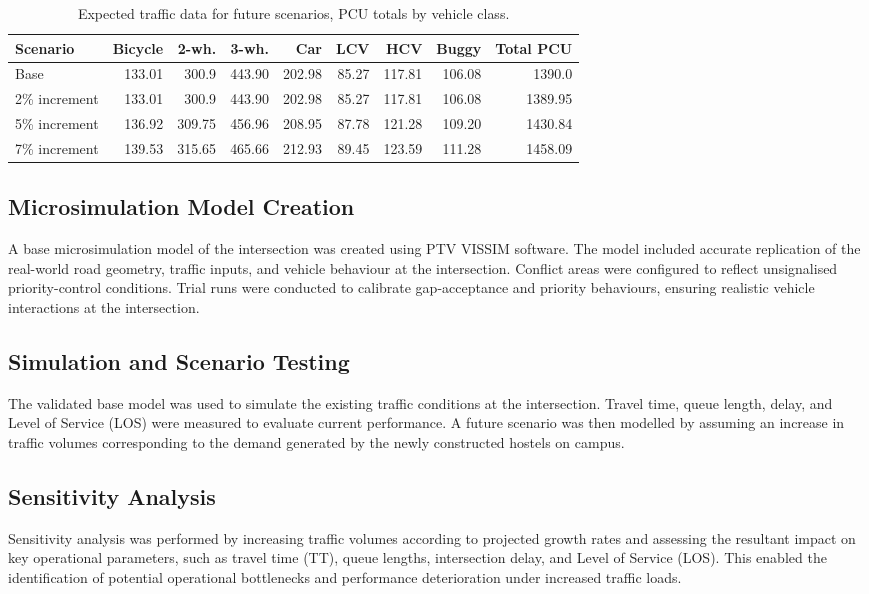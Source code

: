\documentclass[11pt]{article}
\begin{document}
\begin{table}[H]
  \centering
  \small
  \caption{Expected traffic data for future scenarios, PCU totals by vehicle class.}
  \begin{tabular}{@{}lrrrrrrrr@{}}
    \toprule
    \textbf{Scenario} & \textbf{Bicycle} & \textbf{2-wh.} & \textbf{3-wh.} & \textbf{Car} & \textbf{LCV} & \textbf{HCV} & \textbf{Buggy} & \textbf{Total PCU} \\
    \midrule
    Base            & 133.01 & 300.9  & 443.90 & 202.98 & 85.27 & 117.81 & 106.08 & 1390.0 \\
    2\% increment   & 133.01 & 300.9  & 443.90 & 202.98 & 85.27 & 117.81 & 106.08 & 1389.95 \\
    5\% increment   & 136.92 & 309.75 & 456.96 & 208.95 & 87.78 & 121.28 & 109.20 & 1430.84 \\
    7\% increment   & 139.53 & 315.65 & 465.66 & 212.93 & 89.45 & 123.59 & 111.28 & 1458.09 \\
    \bottomrule
  \end{tabular}
\end{table}

\subsection{Microsimulation Model Creation}
A base microsimulation model of the intersection was created using PTV VISSIM software. The model
included accurate replication of the real-world road geometry, traffic inputs, and vehicle behaviour at
the intersection. Conflict areas were configured to reflect unsignalised priority-control conditions.
Trial runs were conducted to calibrate gap-acceptance and priority behaviours, ensuring realistic
vehicle interactions at the intersection.

\subsection{Simulation and Scenario Testing}
The validated base model was used to simulate the existing traffic conditions at the intersection.
Travel time, queue length, delay, and Level of Service (LOS) were measured to evaluate current
performance. A future scenario was then modelled by assuming an increase in traffic volumes
corresponding to the demand generated by the newly constructed hostels on campus.

\subsection{Sensitivity Analysis}
Sensitivity analysis was performed by increasing traffic volumes according to projected growth rates and
assessing the resultant impact on key operational parameters, such as travel time (TT), queue lengths,
intersection delay, and Level of Service (LOS). This enabled the identification of potential operational
bottlenecks and performance deterioration under increased traffic loads.
\end{document}
